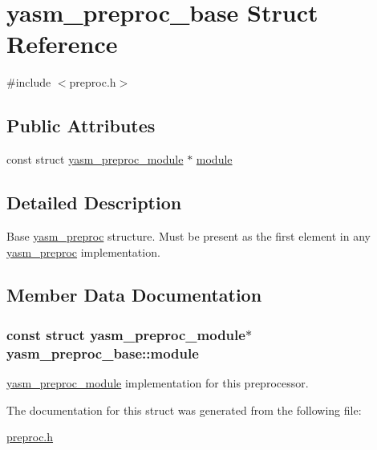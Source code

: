 \hypertarget{structyasm__preproc__base}{\section{yasm\-\_\-preproc\-\_\-base Struct Reference}
\label{structyasm__preproc__base}
}


{\ttfamily \#include $<$preproc.\-h$>$}

\subsection*{Public Attributes}
\begin{DoxyCompactItemize}
\item 
const struct \hyperlink{structyasm__preproc__module}{yasm\-\_\-preproc\-\_\-module} $\ast$ \hyperlink{structyasm__preproc__base_a2bbf2fe82820930da23cb0480efc221c}{module}
\end{DoxyCompactItemize}


\subsection{Detailed Description}
Base \hyperlink{coretype_8h_aa84094d121bb4afca049e6c35efc2c92}{yasm\-\_\-preproc} structure. Must be present as the first element in any \hyperlink{coretype_8h_aa84094d121bb4afca049e6c35efc2c92}{yasm\-\_\-preproc} implementation. 

\subsection{Member Data Documentation}
\hypertarget{structyasm__preproc__base_a2bbf2fe82820930da23cb0480efc221c}{
\subsubsection[{module}]{\setlength{\rightskip}{0pt plus 5cm}const struct {\bf yasm\-\_\-preproc\-\_\-module}$\ast$ yasm\-\_\-preproc\-\_\-base\-::module}}\label{structyasm__preproc__base_a2bbf2fe82820930da23cb0480efc221c}
\hyperlink{structyasm__preproc__module}{yasm\-\_\-preproc\-\_\-module} implementation for this preprocessor. 

The documentation for this struct was generated from the following file\-:\begin{DoxyCompactItemize}
\item 
\hyperlink{preproc_8h}{preproc.\-h}\end{DoxyCompactItemize}
